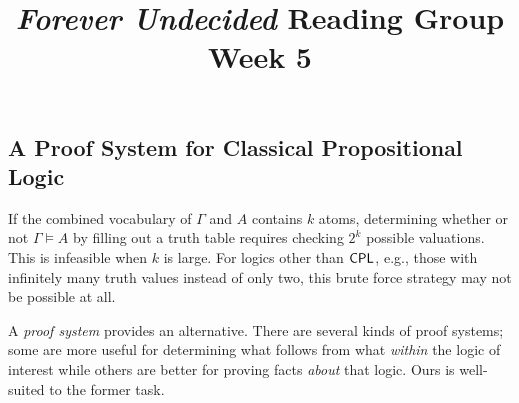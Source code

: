 \documentclass{article}
\title{\emph{Forever Undecided} Reading Group \\ Week 5}
\date{}
\author{}
\begin{document}
\maketitle

\subsection*{A Proof System for Classical Propositional Logic}

If the combined vocabulary of $\Gamma$ and $A$ contains $k$ atoms, determining whether or not $\Gamma \models A$ by filling out a truth table requires checking $2^k$ possible valuations. This is infeasible when $k$ is large. For logics other than $\mathsf{CPL}$, e.g., those with infinitely many truth values instead of only two, this brute force strategy may not be possible at all.

A \textit{proof system} provides an alternative. There are several kinds of proof systems; some are more useful for determining what follows from what \textit{within} the logic of interest while others are better for proving facts \textit{about} that logic. Ours is well-suited to the former task.
\end{document}

